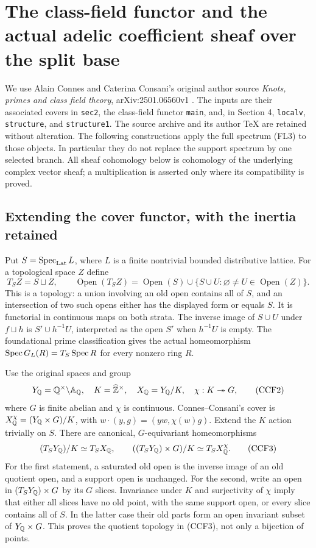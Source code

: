 \section{The class-field functor and the actual adelic coefficient sheaf over the split base}
\label{sec:connes-support-functor}

We use Alain Connes and Caterina Consani's original author source
\emph{Knots, primes and class field theory}, arXiv:2501.06560v1
\cite{ConnesConsani2025}. The inputs are their associated covers in
\texttt{sec2}, the class-field functor \texttt{main}, and, in Section 4,
\texttt{localv}, \texttt{structure}, and \texttt{structure1}.
The source archive and its author TeX are retained without alteration.
The following constructions apply the full spectrum (FL3) to those
objects. In particular they do not replace the support spectrum by
one selected branch. All sheaf cohomology below is cohomology of the
underlying complex vector sheaf; a multiplication is asserted only
where its compatibility is proved.

\subsection{Extending the cover functor, with the inertia retained}

Put $S=\operatorname{Spec}_{\rm Lat} L$, where $L$ is a finite nontrivial bounded
distributive lattice. For a topological space $Z$ define
\[
 T_SZ=S\sqcup Z,\qquad
 \operatorname{Open}(T_SZ)=\operatorname{Open}(S)
 \cup\{S\cup U: \varnothing\ne U\in\operatorname{Open}(Z)\}.
 \tag{CCF1}
\]
This is a topology: a union involving an old open contains all of
$S$, and an intersection of two such opens either has the displayed
form or equals $S$. It is functorial in continuous maps on both
strata. The inverse image of $S\cup U$ under $f\sqcup h$ is
$S'\cup h^{-1}U$, interpreted as the open $S'$ when $h^{-1}U$ is
empty. The foundational prime classification gives the actual
homeomorphism $\operatorname{Spec} G_L(R)=T_S\operatorname{Spec} R$ for every nonzero ring $R$.

Use the original spaces and group
\[
 Y_{\mathbb Q}=\mathbb Q^\times\backslash\mathbb A_{\mathbb Q},\quad
 K=\widehat{\mathbb Z}^{\times},\quad X_{\mathbb Q}=Y_{\mathbb Q}/K,
 \quad \chi:K\twoheadrightarrow G,
 \tag{CCF2}
\]
where $G$ is finite abelian and $\chi$ is continuous. Connes--Consani's
cover is $X_{\mathbb Q}^{\chi}=(Y_{\mathbb Q}\times G)/K$, with
$w\cdot(y,g)=(yw,\chi(w)g)$. Extend the $K$ action trivially on $S$.
There are canonical, $G$-equivariant homeomorphisms
\[
 (T_SY_{\mathbb Q})/K\simeq T_SX_{\mathbb Q},\qquad
 ((T_SY_{\mathbb Q})\times G)/K\simeq T_SX_{\mathbb Q}^{\chi}.
 \tag{CCF3}
\]
For the first statement, a saturated old open is the inverse image
of an old quotient open, and a support open is unchanged. For the
second, write an open in $(T_SY_{\mathbb Q})\times G$ by its $G$ slices.
Invariance under $K$ and surjectivity of $\chi$ imply that either
all slices have no old point, with the same support open, or every
slice contains all of $S$. In the latter case their old parts form
an open invariant subset of $Y_{\mathbb Q}\times G$. This proves the
quotient topology in (CCF3), not only a bijection of points.

